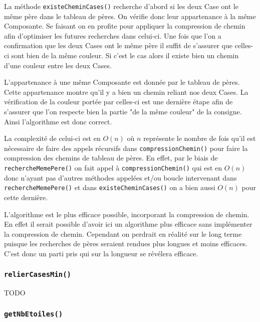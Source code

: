 \documentclass{article}
\newcommand{\info}{\texttt}
\begin{document}
                La méthode \info{existeCheminCases()} recherche d'abord si les deux Case ont le même père dans le tableau de pères. On vérifie donc leur  appartenance à la même Composante. Se faisant on en profite pour appliquer la compression de chemin afin d'optimiser les futures recherches dans celui-ci. Une fois que l'on a confirmation que les deux Cases ont le même père il suffit de s'assurer que celles-ci sont bien de la même couleur. Si c'est le cas alors il existe bien un chemin d'une couleur entre les deux Cases.
                
                L'appartenance à une même Composante est donnée par le tableau de pères. Cette appartenance montre qu'il y a bien un chemin reliant nos deux Cases. La vérification de la couleur portée par celles-ci est une dernière étape afin de s'assurer que l'on respecte bien la partie "de la même couleur" de la consigne. Ainsi l'algorithme est donc correct.
                
                La complexité de celui-ci est en $O(n)$ où $n$ représente le nombre de fois qu'il est nécessaire de faire des appels récursifs dans \info{compressionChemin()} pour faire la compression des chemins de tableau de pères. En effet, par le biais de \info{rechercheMemePere()} on fait appel à \info{compressionChemin()} qui est en $O(n)$ donc n'ayant pas d'autres méthodes appelées et/ou boucle intervenant dans \info{rechercheMemePere()} et dans \info{existeCheminCases()} on a bien aussi $O(n)$ pour cette dernière.
                
                L'algorithme est le plus efficace possible, incorporant la compression de chemin. En effet il serait possible d'avoir ici un algorithme plus efficace sans implémenter la compression de chemin. Cependant on perdrait en réalité sur le long terme puisque les recherches de pères seraient rendues plus longues et moins efficaces. C'est donc un parti pris qui sur la longueur se révélera efficace.
                
            \subsubsection{\info{relierCasesMin()}}
            
                TODO
                
            \subsubsection{\info{getNbEtoiles()}}
                
\end{document}
